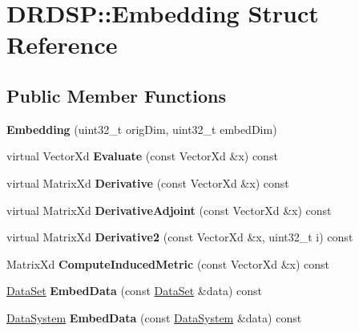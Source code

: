 \hypertarget{struct_d_r_d_s_p_1_1_embedding}{\section{D\-R\-D\-S\-P\-:\-:Embedding Struct Reference}
\label{struct_d_r_d_s_p_1_1_embedding}
}
\subsection*{Public Member Functions}
\begin{DoxyCompactItemize}
\item 
\hypertarget{struct_d_r_d_s_p_1_1_embedding_a044e60ce685c03b1e31a080455a47a43}{{\bfseries Embedding} (uint32\-\_\-t orig\-Dim, uint32\-\_\-t embed\-Dim)}\label{struct_d_r_d_s_p_1_1_embedding_a044e60ce685c03b1e31a080455a47a43}

\item 
\hypertarget{struct_d_r_d_s_p_1_1_embedding_a128ada65c8aafc9348dafd8c89add0da}{virtual Vector\-Xd {\bfseries Evaluate} (const Vector\-Xd \&x) const }\label{struct_d_r_d_s_p_1_1_embedding_a128ada65c8aafc9348dafd8c89add0da}

\item 
\hypertarget{struct_d_r_d_s_p_1_1_embedding_a18d562ec89da43df7dd66b1b8b694e85}{virtual Matrix\-Xd {\bfseries Derivative} (const Vector\-Xd \&x) const }\label{struct_d_r_d_s_p_1_1_embedding_a18d562ec89da43df7dd66b1b8b694e85}

\item 
\hypertarget{struct_d_r_d_s_p_1_1_embedding_a010327f5b83006a24e466deabad5a852}{virtual Matrix\-Xd {\bfseries Derivative\-Adjoint} (const Vector\-Xd \&x) const }\label{struct_d_r_d_s_p_1_1_embedding_a010327f5b83006a24e466deabad5a852}

\item 
\hypertarget{struct_d_r_d_s_p_1_1_embedding_ae651c3ad18c8ad3dbbfea1577d7d395f}{virtual Matrix\-Xd {\bfseries Derivative2} (const Vector\-Xd \&x, uint32\-\_\-t i) const }\label{struct_d_r_d_s_p_1_1_embedding_ae651c3ad18c8ad3dbbfea1577d7d395f}

\item 
\hypertarget{struct_d_r_d_s_p_1_1_embedding_a5d28c64ee0aa19fb2481f16795b31765}{Matrix\-Xd {\bfseries Compute\-Induced\-Metric} (const Vector\-Xd \&x) const }\label{struct_d_r_d_s_p_1_1_embedding_a5d28c64ee0aa19fb2481f16795b31765}

\item 
\hypertarget{struct_d_r_d_s_p_1_1_embedding_a71acf702383901f9d4aa6fb198dc0892}{\hyperlink{struct_d_r_d_s_p_1_1_data_set}{Data\-Set} {\bfseries Embed\-Data} (const \hyperlink{struct_d_r_d_s_p_1_1_data_set}{Data\-Set} \&data) const }\label{struct_d_r_d_s_p_1_1_embedding_a71acf702383901f9d4aa6fb198dc0892}

\item 
\hypertarget{struct_d_r_d_s_p_1_1_embedding_abdf67b0ed050b58fc9a0943d604093ef}{\hyperlink{struct_d_r_d_s_p_1_1_data_system}{Data\-System} {\bfseries Embed\-Data} (const \hyperlink{struct_d_r_d_s_p_1_1_data_system}{Data\-System} \&data) const }\label{struct_d_r_d_s_p_1_1_embedding_abdf67b0ed050b58fc9a0943d604093ef}

\end{DoxyCompactItemize}
